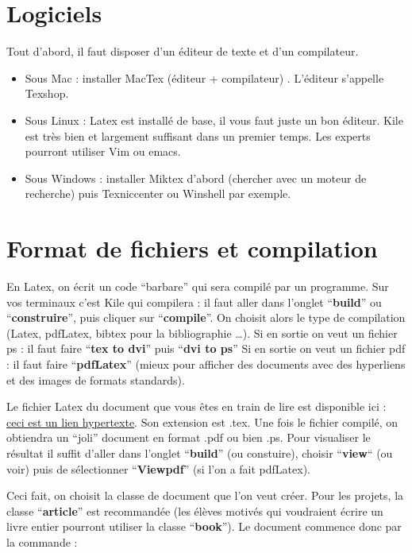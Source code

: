 \section{Logiciels}
Tout d'abord, il faut disposer d'un éditeur de texte et d'un compilateur.

\begin{itemize}
\item Sous Mac : installer MacTex  (éditeur + compilateur) . L'éditeur s'appelle Texshop.  
\item Sous Linux : Latex est installé de base, il vous faut juste un bon éditeur. Kile est très
 bien et largement suffisant
dans un premier temps. Les experts pourront utiliser Vim ou emacs. 
\item Sous Windows : installer Miktex d'abord (chercher avec un moteur de recherche) puis Texniccenter 
ou  Winshell par exemple.
\end{itemize}


\section{Format de fichiers et compilation}
En Latex, on écrit un code ``barbare'' qui sera compil\'e par un programme. Sur vos terminaux c'est Kile 
qui compilera : il faut aller dans l'onglet ``\textbf{build}'' ou ``\textbf{construire}'', puis cliquer 
sur ``\textbf{compile}''. On choisit alors le type de compilation (Latex, pdfLatex, bibtex pour la
 bibliographie \ldots). 
Si en sortie on veut un fichier ps : il faut faire ``\textbf{tex to dvi}'' puis  ``\textbf{dvi to ps}''
Si en sortie on veut un fichier pdf : il faut faire ``\textbf{pdfLatex}'' (mieux pour afficher des documents 
avec des hyperliens et des images de formats standards).

Le fichier Latex du document que vous êtes en train de lire est  disponible ici : 
\href{http://people.math.jussieu.fr/~salmon/enseignement/M1/introlatex.tex}{ceci est un lien hypertexte}.  
Son extension est  .tex. Une fois le fichier compilé,  on obtiendra un ``joli'' document en format .pdf 
ou bien .ps. Pour visualiser le résultat il suffit d'aller dans l'onglet  ``\textbf{build}'' 
(ou constuire), choisir ``\textbf{view}`` (ou voir) puis de sélectionner ``\textbf{Viewpdf}'' 
(si l'on a fait pdfLatex).\medskip

Ceci fait, on choisit la classe de document  que l'on veut créer.  Pour les projets,  
la classe ``\textbf{article}'' est recommandée (les élèves motivés qui voudraient écrire un 
livre entier pourront utiliser la classe ``\textbf{book}''). Le document commence donc par la 
commande :\medskip

